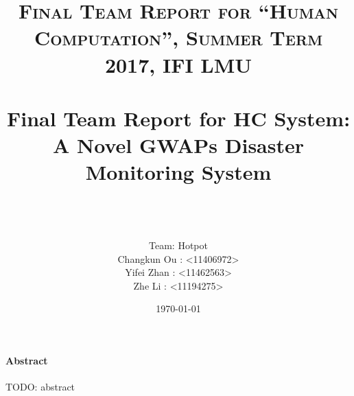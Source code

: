 \documentclass[paper=a4, fontsize=11pt]{scrartcl}
\title{	
\normalfont \normalsize 
\textsc{Final Team Report for ``Human Computation'', Summer Term 2017, IFI LMU} \\ [25pt]
\horrule{0.5pt} \\[0.4cm]
\huge Final Team Report for HC System: \\
A Novel GWAPs Disaster Monitoring System\\
\horrule{2pt} \\[0.5cm] %
}
\author{
  \\ Team: Hotpot\\
  Changkun Ou : <11406972> \\
  Yifei Zhan : <11462563> \\
  Zhe Li : <11194275>  }
\date{\today}
\theoremstyle{definition}
\numberwithin{equation}{section}
\numberwithin{figure}{section}
\numberwithin{table}{section}
\begin{document}
\maketitle
\tableofcontents

\paragraph{Abstract}
TODO: abstract







\nocite{*}


\end{document}
